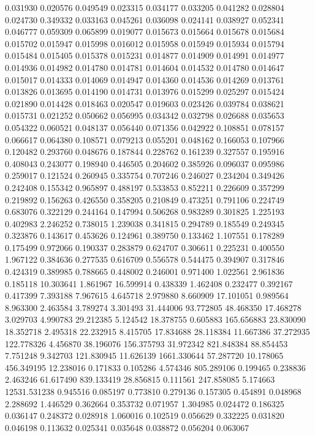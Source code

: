 0.031930
0.020576
0.049549
0.023315
0.034177
0.033205
0.041282
0.028804
0.024730
0.349332
0.033163
0.045261
0.036098
0.024141
0.038927
0.052341
0.046777
0.059309
0.065899
0.019077
0.015673
0.015664
0.015678
0.015684
0.015702
0.015947
0.015998
0.016012
0.015958
0.015949
0.015934
0.015794
0.015484
0.015405
0.015378
0.015231
0.014877
0.014909
0.014991
0.014977
0.014936
0.014982
0.014780
0.014781
0.014604
0.014532
0.014780
0.014647
0.015017
0.014333
0.014069
0.014947
0.014360
0.014536
0.014269
0.013761
0.013826
0.013695
0.014190
0.014731
0.013976
0.015299
0.025297
0.015424
0.021890
0.014428
0.018463
0.020547
0.019603
0.023426
0.039784
0.038621
0.015731
0.021252
0.050662
0.056995
0.034342
0.032798
0.026688
0.035653
0.054322
0.060521
0.048137
0.056440
0.071356
0.042922
0.108851
0.078157
0.066617
0.064380
0.108571
0.079213
0.055201
0.048162
0.166053
0.107966
0.120482
0.293760
0.048676
0.187844
0.228762
0.161239
0.327557
0.195916
0.408043
0.243077
0.198940
0.446505
0.204602
0.385926
0.096037
0.095986
0.259017
0.121524
0.260945
0.335754
0.707246
0.246027
0.234204
0.349426
0.242408
0.155342
0.965897
0.488197
0.533853
0.852211
0.226609
0.357299
0.219892
0.156263
0.426550
0.358205
0.210849
0.473251
0.791106
0.224749
0.683076
0.322129
0.244164
0.147994
0.506268
0.983289
0.301825
1.225193
0.402983
2.246252
0.738015
1.239038
0.341815
0.294789
0.185549
0.249345
0.323876
0.143617
0.453626
0.124961
0.389750
0.133462
1.107551
0.178289
0.175499
0.972066
0.190337
0.283879
0.624707
0.306611
0.225231
0.400550
1.967122
0.384636
0.277535
0.616709
0.556578
0.544475
0.394907
0.317846
0.424319
0.389985
0.788665
0.448002
0.246001
0.971400
1.022561
2.961836
0.185118
10.303641
1.861967
16.599914
0.438339
1.462408
0.232477
0.392167
0.417399
7.393188
7.967615
4.645718
2.979880
8.660909
17.101051
0.989564
8.963300
2.463584
3.789274
3.301493
31.444006
93.772805
48.468350
17.468278
3.029703
4.990783
29.212385
5.124542
18.378755
0.605883
165.656883
23.830090
18.352718
2.495318
22.232915
8.415705
17.834688
28.118384
11.667386
37.272935
122.778326
4.456870
38.196076
156.375793
31.972342
821.848384
88.854453
7.751248
9.342703
121.830945
11.626139
1661.330644
57.287720
10.178065
456.349195
12.238016
0.171833
0.105286
4.574346
805.289106
0.199465
0.238836
2.463246
61.617490
839.133419
28.856815
0.111561
247.858085
5.174663
12531.531238
0.945516
0.085197
0.773810
0.279136
0.157305
0.454891
0.048968
2.288692
1.446529
0.362664
0.353732
0.071957
1.304985
0.024472
0.186325
0.036147
0.248372
0.028918
1.060016
0.102519
0.056629
0.332225
0.031820
0.046198
0.113632
0.025341
0.035648
0.038872
0.056204
0.063067
